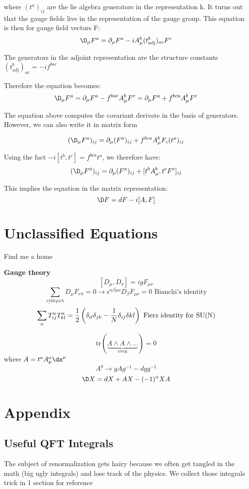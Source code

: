 \documentclass[11pt]{scrartcl}
\begin{document}
	where $(t^a)_{ij}$ are the lie algebra generators in the representation k.
	\newline
	It turns out that the gauge fields live in the  representation of the gauge group.
	This equation is then for gauge field vectors F:
	\[ \D_\mu F^a = \partial_\mu F^a - i A_\mu^b(t_{\mathrm{adj}}^b)_{ac} F^c \]
	
	The generators in the adjoint representation are the structure constants $(t^b_{\mathrm{adj}})_{ac} = - i f^{bac}$
	
	Therefore the equation becomes:
	\[ \D_\mu F^a = \partial_\mu F^a - f^{bac} A_\mu^b F^c =  \partial_\mu F^a + f^{bca} A_\mu^b F^c \]
	
	The equation above computes the covariant derivate in the basis of generators.  However, we can also write it in matrix form
	
	\[ (\D_\mu F^a)_{ij} =  \partial_\mu (F^a)_{ij} + f^{bca} A_\mu^b F_c (t^{a})_{ij} \]
	
	Using the fact $-i [t^b, t^c] = f^{bca} t^a$, we therefore have:
	\[ (\D_\mu F^a)_{ij} =  \partial_\mu (F^a)_{ij} + [t^b A_\mu^b, t^c F^c]_{ij} \]
	
	This implies the equation in the matrix representation:
	\[ \D F = dF - i [A, F] \]
	

\section{Unclassified Equations}
Find me a home

\textbf{Gauge theory}
\[ [D_\mu, D_\nu] = i g F_{\mu \nu} \]
\[ \sum_{\text{cylic} \mu \nu \lambda} D_{\mu} F_{\nu \lambda} = 0 \rightarrow \epsilon^{\alpha \beta \mu \nu} D_{\beta} F_{\mu \nu} = 0 \text{  Bianchi's identity} \]
\[ \sum_a T^a_{ij} T^a_{kl} = \frac12 \left(\delta_{il} \delta_{jk} - {1 \over N} \delta_{ij} \delta{kl} \right)  \text{  Fierz identity for SU(N)} \]

\[ \mathrm{tr} \left( \underbrace{ A \wedge A \wedge ... }_{\text{even}} \right) = 0 \]
where $ A =  t^a A^a_\mu \dx^\mu$
\[A^g \rightarrow g A g^{-1} - dg g^{-1} \]
\[ \D X = d X + A X - (-1)^n X A \]


\section{Appendix}
\subsection{Useful QFT Integrals}
The subject of renormalization gets hairy because we often get tangled in the math (big ugly integrals) and lose track of the physics.  We collect those integrals trick in 1 section for reference
\end{document}
